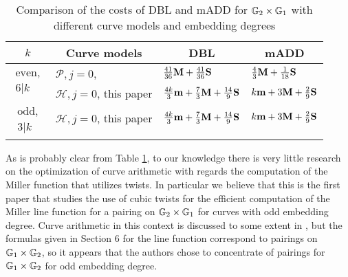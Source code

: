 \begin{table}[h]
\centering
\caption{Comparison of the costs of DBL and mADD for $\mathbb{G}_{2} \times \mathbb{G}_{1}$ with different curve models and embedding degrees}

\begin{tabular}{| l | l | l | l |}
\hline
\multicolumn{1}{|c|}{$k$}
&\multicolumn{1}{|c|}{Curve models}	&\multicolumn{1}{|c|}{DBL}	&\multicolumn{1}{|c|}{mADD}	
\\
\hline
\multicolumn{1}{|c|}{\multirow{2}{*}{
$\begin{array}{c} \text{even,} \\ 6|k \end{array}$}}
& $\mathcal{P},j=0$, \cite{2009/fastertate}
& $\frac{41}{36}\textbf{M} + \frac{41}{36}\textbf{S}$
& $\frac{4}{3}\textbf{M} + \frac{1}{18}\textbf{S}$ \\
& $\mathcal{H},j=0$, this paper
& $\frac{4k}{3}\textbf{m} + \frac{7}{3}\textbf{M} + \frac{14}{9}\textbf{S} $
& $k\textbf{m} + 3\textbf{M} + \frac{2}{9}\textbf{S}$ \\
\hline
\multicolumn{1}{|c|}{\multirow{2}{*}{
$\begin{array}{c} \text{odd,} \\ 3|k \end{array}$}}
& $\mathcal{H},j=0$, this paper
& $\frac{4k}{3}\textbf{m} + \frac{7}{3}\textbf{M} + \frac{14}{9}\textbf{S} $
& $k\textbf{m} + 3\textbf{M} + \frac{2}{9}\textbf{S}$ \\
&&& \\
\hline
\end{tabular}
\label{tbl-cmp2}


\end{table}

As is probably clear from Table \ref{tbl-cmp2}, to our knowledge there is very little research on the optimization of curve arithmetic with regards the computation of the Miller function 
that utilizes twists. 
In particular we believe that this is the first paper that studies the use of cubic twists for the efficient computation of the Miller line function for a pairing on $\mathbb{G}_{2} \times \mathbb{G}_{1}$
for curves with odd embedding degree.
Curve arithmetic in this context is discussed to some extent in \cite{2009/fastertate}, 
but the formulas given in Section 6 for the line function correspond to pairings on $\mathbb{G}_{1} \times \mathbb{G}_{2}$, so it appears that the authors chose to concentrate of pairings for $\mathbb{G}_{1} \times \mathbb{G}_{2}$ for odd embedding degree.


